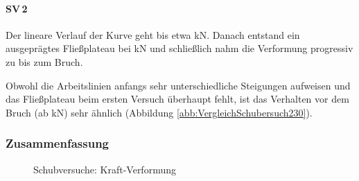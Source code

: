 \paragraph{SV\,2}
Der lineare Verlauf der Kurve geht bis etwa \unit[200]{kN}. Danach entstand ein ausgeprägtes Fließplateau bei \unit[225]{kN} und schließlich nahm die Verformung progressiv zu bis zum Bruch.

Obwohl die Arbeitslinien anfangs sehr unterschiedliche Steigungen aufweisen und das Fließplateau beim ersten Versuch überhaupt fehlt, ist das Verhalten vor dem Bruch (ab \unit[230]{kN}) sehr ähnlich (Abbildung \ref{abb:VergleichSchubersuch230}).

\subsubsection{Zusammenfassung}


\begin{figure}[h!]
\begin{center}

\caption{Schubversuche: Kraft-Verformung}
\label{abb:Scherversuch Kraft Verschiebungslinie}
\end{center}
\end{figure}




